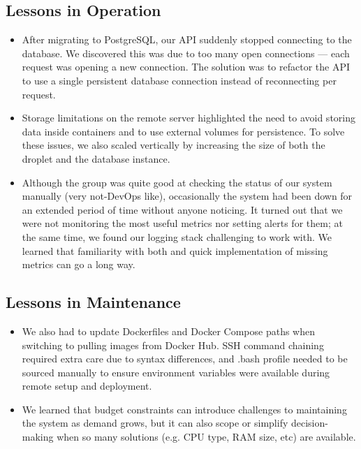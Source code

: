 \subsection{Lessons in Operation}
\begin{itemize}
    \item After migrating to PostgreSQL, our API suddenly stopped connecting to the database. We discovered this was due to too many open connections — each request was opening a new connection. The solution was to refactor the API to use a single persistent database connection instead of reconnecting per request.
    \item Storage limitations on the remote server highlighted the need to avoid storing data inside containers and to use external volumes for persistence. To solve these issues, we also scaled vertically by increasing the size of both the droplet and the database instance.
    \item Although the group was quite good at checking the status of our system manually (very not-DevOps like), occasionally the system had been down for an extended period of time without anyone noticing. It turned out that we were not monitoring the most useful metrics nor setting alerts for them; at the same time, we found our logging stack challenging to work with. We learned that familiarity with both and quick implementation of missing metrics can go a long way.
\end{itemize}

\subsection{Lessons in Maintenance}

\begin{itemize}
    \item We also had to update Dockerfiles and Docker Compose paths when switching to pulling images from Docker Hub. SSH command chaining required extra care due to syntax differences, and .bash profile needed to be sourced manually to ensure environment variables were available during remote setup and deployment.
    \item We learned that budget constraints can introduce challenges to maintaining the system as demand grows, but it can also scope or simplify decision-making when so many solutions (e.g. CPU type, RAM size, etc) are available. 
\end{itemize}

